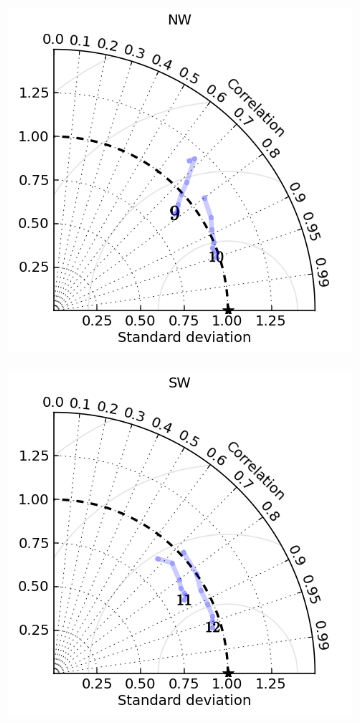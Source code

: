 \begin{figure}[!hbt]
\begin{subfigure}{0.30\textwidth}
        \caption{}
    \end{subfigure}
    \begin{subfigure}{0.30\textwidth}
        \includegraphics[width=\textwidth]{figures/plots/taylor_diag_res_NW.png}
        \caption{}
    \end{subfigure}
  \begin{subfigure}{0.30\textwidth}
     \includegraphics[width=\textwidth]{figures/plots/taylor_diag_res_SW.png}

\end{subfigure}
\end{figure}
